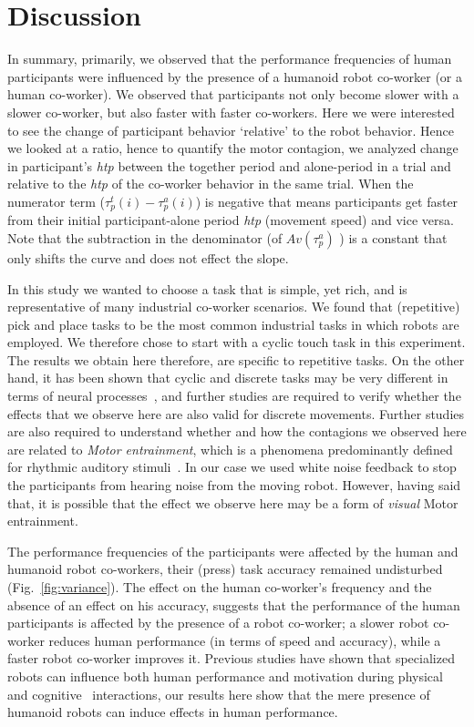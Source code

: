 
\clearpage
\section{Discussion}
In summary, primarily, we observed that the performance frequencies of human participants were influenced by the presence of a humanoid robot co-worker (or a human co-worker). We observed that participants not only become slower with a slower co-worker, but also faster with faster co-workers. Here we were interested to see the change of participant behavior `relative' to the robot behavior. Hence we looked at a ratio, hence to quantify the motor contagion, we analyzed change in participant's \textit{htp} between the together period and alone-period in a trial and relative to the {\it htp} of the co-worker behavior in the same trial. When the numerator term ($\tau_p^t(i)-\tau_p^a(i)$) is negative that means participants get faster from their initial participant-alone period \textit{htp} (movement speed) and vice versa. Note that the subtraction in the denominator (of $Av(\tau_p^a)$ ) is a constant that only shifts the curve and does not effect the slope.  

In this study we wanted to choose a task that is simple, yet rich, and is representative of many industrial co-worker scenarios. We found that (repetitive) pick and place tasks to be the most common industrial tasks in which robots are employed. We therefore chose to start with a cyclic touch task in this experiment. The results we obtain here therefore, are specific to repetitive tasks. On the other hand, it has been shown that cyclic and discrete tasks may be very different in terms of neural processes~\cite{Schaal:Nature:2004}, and further studies are required to verify whether the effects that we observe here are also valid for discrete movements. Further studies are also required to understand whether and how the contagions we observed here are related to \textit{Motor entrainment}, which is a phenomena predominantly defined for rhythmic auditory stimuli~\cite{Tierney:Frontiers:2014,Schachner:Elsevier:2009}. In our case we used white noise feedback to stop the participants from hearing noise from the moving robot. However, having said that, it is possible that the effect we observe here may be a form of \textit{visual} Motor entrainment. 

The performance frequencies of the participants were affected by the human and humanoid robot co-workers, their (press) task accuracy remained undisturbed (Fig.~\ref{fig:variance}). The effect on the human co-worker's frequency and the absence of an effect on his accuracy, suggests that the performance of the human participants is affected by the presence of a robot co-worker; a slower robot co-worker reduces human performance (in terms of speed and accuracy), while a faster robot co-worker improves it. Previous studies have shown that specialized robots can influence both human performance and motivation during physical~\cite{Takagi:Nature:2017} and cognitive~\cite{Fasola:ICDL:2010} interactions, our results here show that the mere presence of humanoid robots can induce effects in human performance. 

